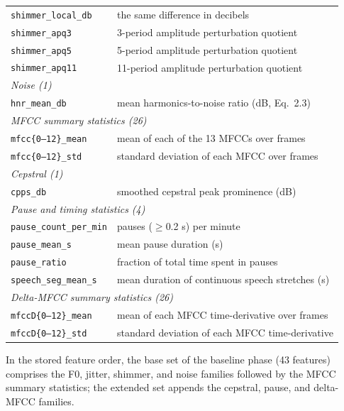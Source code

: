 \begin{longtable}{p{4.4cm} p{9.6cm}}
\texttt{shimmer\_local\_db} & the same difference in decibels \\
\texttt{shimmer\_apq3}     & 3-period amplitude perturbation quotient \\
\texttt{shimmer\_apq5}     & 5-period amplitude perturbation quotient \\
\texttt{shimmer\_apq11}    & 11-period amplitude perturbation quotient \\
\midrule
\multicolumn{2}{l}{\emph{Noise (1)}}\\
\texttt{hnr\_mean\_db}     & mean harmonics-to-noise ratio (dB, Eq.~2.3) \\
\midrule
\multicolumn{2}{l}{\emph{MFCC summary statistics (26)}}\\
\texttt{mfcc\{0--12\}\_mean} & mean of each of the 13 MFCCs over frames \\
\texttt{mfcc\{0--12\}\_std}  & standard deviation of each MFCC over frames \\
\midrule
\multicolumn{2}{l}{\emph{Cepstral (1)}}\\
\texttt{cpps\_db}          & smoothed cepstral peak prominence (dB) \\
\midrule
\multicolumn{2}{l}{\emph{Pause and timing statistics (4)}}\\
\texttt{pause\_count\_per\_min} & pauses ($\geq$0.2 s) per minute \\
\texttt{pause\_mean\_s}    & mean pause duration (s) \\
\texttt{pause\_ratio}      & fraction of total time spent in pauses \\
\texttt{speech\_seg\_mean\_s} & mean duration of continuous speech stretches (s) \\
\midrule
\multicolumn{2}{l}{\emph{Delta-MFCC summary statistics (26)}}\\
\texttt{mfccD\{0--12\}\_mean} & mean of each MFCC time-derivative over frames \\
\texttt{mfccD\{0--12\}\_std}  & standard deviation of each MFCC time-derivative \\
\bottomrule
\end{longtable}

In the stored feature order, the base set of the baseline phase
(43 features) comprises the F0, jitter, shimmer, and noise families
followed by the MFCC summary statistics; the extended set appends the
cepstral, pause, and delta-MFCC families.
